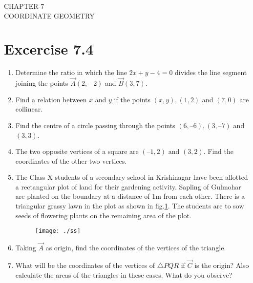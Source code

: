 \documentclass[12pt]{article}
\begin{document}
\begin{center}
\textbf\large{CHAPTER-7 \\ COORDINATE GEOMETRY}

\end{center}
\section*{Excercise 7.4}
\fi
\begin{enumerate}[label=\thesection.\arabic*,ref=\thesection.\theenumi]
\item Determine the ratio in which the line $2x+y  - 4=0$ divides the line segment joining the points $\vec{A}(2, - 2)$  and  $\vec{B}(3, 7)$.
\item Find a relation between $x$ and $y$ if the points $(x, y), (1, 2)$  and  $(7, 0)$ are collinear.

\item Find the centre of a circle passing through the points $(6, – 6), (3, – 7)$ and $ (3, 3)$.

\item The two opposite vertices of a square are $(–1, 2)$  and $ (3, 2)$. Find the coordinates of the other two vertices.
\\
	
\iffalse
\item The Class X students of a secondary school in Krishinagar have been allotted a rectangular plot of land for their gardening activity. Sapling of Gulmohar are planted on the boundary at a distance of 1m from each other. There is a triangular grassy lawn in the plot as shown in fig.\ref{fig:Fig1}. The students are to sow seeds of flowering plants on the remaining area of the plot.\\

\begin{figure}[!h]
	\begin{center} 
	    \texttt{[image: ./ss]}
	\end{center}
\caption{}
\label{fig:Fig1}
\end{figure}
\item Taking $\vec{A}$ as origin, find the coordinates of the vertices of the triangle.
\item What will be the coordinates of the vertices of $\triangle PQR$ if $\vec{C}$ is the origin?
Also calculate the areas of the triangles in these cases. What do you observe?
\end{enumerate}
\end{document}
